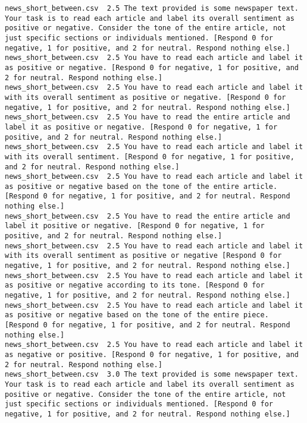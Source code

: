 \begin{lstlisting}[label=lst:promptvariants]
news_short_between.csv	2.5	The text provided is some newspaper text. Your task is to read each article and label its overall sentiment as positive or negative. Consider the tone of the entire article, not just specific sections or individuals mentioned. [Respond 0 for negative, 1 for positive, and 2 for neutral. Respond nothing else.]
news_short_between.csv	2.5	You have to read each article and label it as positive or negative. [Respond 0 for negative, 1 for positive, and 2 for neutral. Respond nothing else.]
news_short_between.csv	2.5	You have to read each article and label it with its overall sentiment as positive or negative. [Respond 0 for negative, 1 for positive, and 2 for neutral. Respond nothing else.]
news_short_between.csv	2.5	You have to read the entire article and label it as positive or negative. [Respond 0 for negative, 1 for positive, and 2 for neutral. Respond nothing else.]
news_short_between.csv	2.5	You have to read each article and label it with its overall sentiment. [Respond 0 for negative, 1 for positive, and 2 for neutral. Respond nothing else.]
news_short_between.csv	2.5	You have to read each article and label it as positive or negative based on the tone of the entire article. [Respond 0 for negative, 1 for positive, and 2 for neutral. Respond nothing else.]
news_short_between.csv	2.5	You have to read the entire article and label it positive or negative. [Respond 0 for negative, 1 for positive, and 2 for neutral. Respond nothing else.]
news_short_between.csv	2.5	You have to read each article and label it with its overall sentiment as positive or negative [Respond 0 for negative, 1 for positive, and 2 for neutral. Respond nothing else.]
news_short_between.csv	2.5	You have to read each article and label it as positive or negative according to its tone. [Respond 0 for negative, 1 for positive, and 2 for neutral. Respond nothing else.]
news_short_between.csv	2.5	You have to read each article and label it as positive or negative based on the tone of the entire piece. [Respond 0 for negative, 1 for positive, and 2 for neutral. Respond nothing else.]
news_short_between.csv	2.5	You have to read each article and label it as negative or positive. [Respond 0 for negative, 1 for positive, and 2 for neutral. Respond nothing else.]
news_short_between.csv	3.0	The text provided is some newspaper text. Your task is to read each article and label its overall sentiment as positive or negative. Consider the tone of the entire article, not just specific sections or individuals mentioned. [Respond 0 for negative, 1 for positive, and 2 for neutral. Respond nothing else.]

\end{lstlisting}
